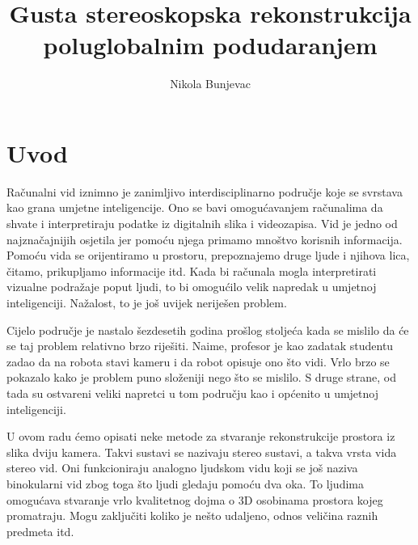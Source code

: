 \documentclass[utf8, zavrsni, numeric]{fer}
\begin{document}
\nocite{*}


\title{Gusta stereoskopska rekonstrukcija poluglobalnim podudaranjem}

\author{Nikola Bunjevac}

\maketitle

\izvornik

\zahvala{}

\tableofcontents

\chapter{Uvod}
Računalni vid iznimno je zanimljivo interdisciplinarno područje koje se svrstava kao grana umjetne inteligencije.
Ono se bavi omogućavanjem računalima da shvate i interpretiraju podatke iz digitalnih slika i videozapisa.
Vid je jedno od najznačajnijih osjetila jer pomoću njega primamo mnoštvo korisnih informacija.
Pomoću vida se orijentiramo u prostoru, prepoznajemo druge ljude i njihova lica, čitamo, prikupljamo informacije itd.
Kada bi računala mogla interpretirati vizualne podražaje poput ljudi, to bi omogućilo velik
napredak u umjetnoj inteligenciji. Nažalost, to je još uvijek neriješen problem.

Cijelo područje
je nastalo šezdesetih godina prošlog stoljeća kada se mislilo da će se taj problem relativno brzo riješiti.
Naime, profesor je kao zadatak studentu zadao da na robota stavi kameru i da robot opisuje ono što vidi.
Vrlo brzo se pokazalo kako je problem puno složeniji nego što se mislilo.
S druge strane, od tada su ostvareni veliki napretci u tom području kao i općenito u umjetnoj inteligenciji.

U ovom radu ćemo opisati neke metode za stvaranje rekonstrukcije prostora iz slika dviju kamera. Takvi sustavi se nazivaju stereo sustavi, a takva vrsta vida stereo vid.
Oni funkcioniraju analogno ljudskom vidu koji se još naziva binokularni vid zbog toga što ljudi gledaju pomoću dva oka. To ljudima omogućava stvaranje vrlo kvalitetnog dojma o 3D osobinama prostora kojeg promatraju. Mogu zaključiti koliko je nešto udaljeno, odnos veličina raznih predmeta itd.
\end{document}
